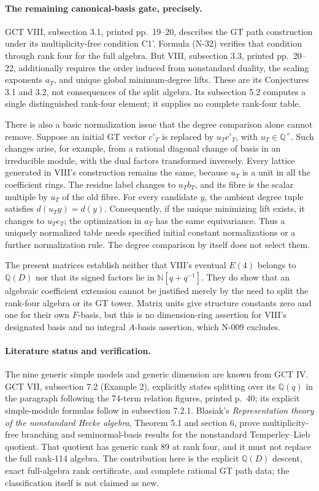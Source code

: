 \paragraph{The remaining canonical-basis gate, precisely.}
GCT VIII, subsection 3.1, printed pp.~19--20, describes the GT path
construction under its multiplicity-free condition C1'.  Formula
(N-32) verifies that condition through rank four for the full algebra.
But VIII, subsection 3.3, printed pp.~20--22, additionally requires
the order induced from nonstandard duality, the scaling exponents
$a_T$, and unique global minimum-degree lifts.  These are its
Conjectures 3.1 and 3.2, not consequences of the split algebra.
Its subsection 5.2 computes a single distinguished rank-four element;
it supplies no complete rank-four table.

There is also a basic normalization issue that the degree comparison
alone cannot remove.  Suppose an initial GT vector $c'_T$ is replaced
by $u_Tc'_T$, with $u_T\in\mathbb Q^\times$.  Such changes arise, for
example, from a rational diagonal change of basis in an irreducible
module, with the dual factors transformed inversely.  Every lattice
generated in VIII's construction remains the same, because $u_T$ is
a unit in all the coefficient rings.  The residue label changes to
$u_Tb_T$, and its fibre is the scalar multiple by $u_T$ of the old
fibre.  For every candidate $y$, the ambient degree tuple satisfies
$d(u_Ty)=d(y)$.  Consequently, if the unique minimizing lift exists,
it changes to $u_Te_T$; the optimization in $a_T$ has the same
equivariance.  Thus a uniquely normalized table needs specified
initial constant normalizations or a further normalization rule.
The degree comparison by itself does not select them.

The present matrices establish neither that VIII's eventual $E(4)$
belongs to $\mathbb Q(D)$ nor that its signed factors lie in
$\mathbb N[q+q^{-1}]$.  They do show that an algebraic coefficient
extension cannot be justified merely by the need to split the
rank-four algebra or its GT tower.  Matrix units give structure
constants zero and one for their own $F$-basis, but this is no
dimension-ring assertion for VIII's designated basis and no integral
$A$-basis assertion, which N-009 excludes.

\paragraph{Literature status and verification.}
The nine generic simple models and generic dimension are known from
GCT IV.  GCT VII, subsection 7.2 (Example 2), explicitly states
splitting over its $\mathbb Q(q)$ in the paragraph following the
74-term relation figures, printed p.~40; its explicit simple-module
formulas follow in subsection 7.2.1.  Blasiak's \emph{Representation
theory of the nonstandard Hecke algebra}, Theorem 5.1 and section 6,
prove multiplicity-free branching and seminormal-basis results for
the nonstandard Temperley--Lieb quotient.  That quotient has generic
rank 89 at rank four, and it must not replace the full rank-114 algebra.
The contribution here is the explicit $\mathbb Q(D)$ descent, exact
full-algebra rank certificate, and complete rational GT path data;
the classification itself is not claimed as new.


